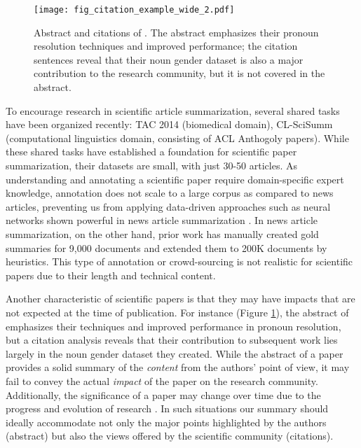 \documentclass[letterpaper]{article} \usepackage{aaai19}  \usepackage{times}  \usepackage{helvet}  \usepackage{courier}  \usepackage{url}
\begin{document}
\begin{figure}[!t]
    \vspace{-2mm}
    \hspace{-2mm}
    \centering
    \texttt{[image: fig\_citation\_example\_wide\_2.pdf]}\vspace{-3mm}
    \caption{
    Abstract and citations of \protect\cite{bergsma-lin:2006:COLACL}. The abstract emphasizes their pronoun resolution techniques and improved performance; the citation sentences reveal that their noun gender dataset is also a major contribution to the research community, but it is not covered in the abstract.
    }
\label{fig:citation}
\vspace{-4mm}
\end{figure}


To encourage research in scientific article summarization, several shared tasks have been organized recently: TAC 2014 (biomedical domain),
CL-SciSumm \cite{jaidka2016overview,jaidka2017overview,jaidka2018overview} (computational linguistics domain, consisting of ACL Anthogoly papers).
While these shared tasks have established a foundation for scientific paper summarization, their datasets are small, with just 30-50 articles.
As understanding and annotating a scientific paper require domain-specific expert knowledge, annotation does not scale to a large corpus as compared to news articles, preventing us from
applying data-driven approaches such as neural networks shown powerful in news article summarization
\cite{cheng-lapata:2016:P16-1,see2017get}.
In news article summarization, on the other hand,
prior work \cite{woodsend-lapata:2010:ACL,cheng-lapata:2016:P16-1}
has manually
created gold summaries for 9,000 documents
and extended them to 200K documents by heuristics.
This type of annotation or crowd-sourcing is not realistic for scientific papers due to their length and technical content.

Another characteristic of scientific papers is that they may have impacts that are not expected at the time of publication.
For instance (Figure \ref{fig:citation}), the abstract of \citeauthor{bergsma-lin:2006:COLACL} emphasizes their techniques and
improved
performance in pronoun resolution, but a citation analysis reveals that their contribution to subsequent work lies largely in the noun gender dataset they created.
While the abstract of a paper provides a solid summary of the {\it content} from the authors' point of view, it may fail to convey the actual {\it impact} of the paper on the research community.
Additionally, the significance of a paper may change over time
due to the progress and evolution of
research \cite{mei-zhai:2008:ACLMain}.
In such situations our summary should ideally accommodate not only the major points highlighted by the authors (abstract) but also the views offered by the scientific community (citations).
\end{document}
